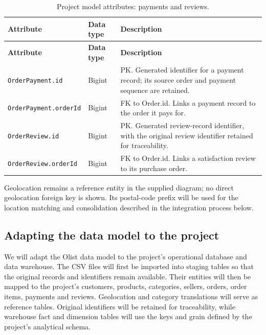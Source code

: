 \documentclass[a4paper,12pt]{article}
\newcommand{\tablestyle}{%
  \small\setstretch{1.05}%
  \renewcommand{\arraystretch}{1.25}%
  \setlength{\extrarowheight}{3pt}%
  \arrayrulecolor{tableborder}%
}
\begin{document}
{\tablestyle
\begin{longtable}{|L{5.7cm}|L{2.1cm}|L{\dimexpr\textwidth-7.8cm-6\arrayrulewidth\relax}|}
  \caption{Project model attributes: payments and reviews.}
  \label{tab:project-model-4}\\
  \hline
  \textbf{Attribute} & \textbf{Data type} & \textbf{Description} \\[3pt]\hline
  \endfirsthead
  \hline
  \textbf{Attribute} & \textbf{Data type} & \textbf{Description} \\[3pt]\hline
  \endhead
  \endfoot
  \endlastfoot
  \nolinkurl{OrderPayment.id} & Bigint & PK. Generated identifier for a payment record; its source order and payment sequence are retained. \\[3pt]\hline
  \nolinkurl{OrderPayment.orderId} & Bigint & FK to Order.id. Links a payment record to the order it pays for. \\[3pt]\hline
  \nolinkurl{OrderReview.id} & Bigint & PK. Generated review-record identifier, with the original review identifier retained for traceability. \\[3pt]\hline
  \nolinkurl{OrderReview.orderId} & Bigint & FK to Order.id. Links a satisfaction review to its purchase order. \\[3pt]\hline
\end{longtable}
}

Geolocation remains a reference entity in the supplied diagram; no direct
geolocation foreign key is shown. Its postal-code prefix will be used for the
location matching and consolidation described in the integration process below.

\subsection{Adapting the data model to the project}

We will adapt the Olist data model to the project's operational database and data
warehouse. The CSV files will first be imported into staging tables so that the
original records and identifiers remain available. Their entities will then be
mapped to the project's customers, products, categories, sellers, orders, order
items, payments and reviews. Geolocation and category translations will serve as
reference tables. Original identifiers will be retained for traceability, while
warehouse fact and dimension tables will use the keys and grain defined by the
project's analytical schema.
\end{document}
